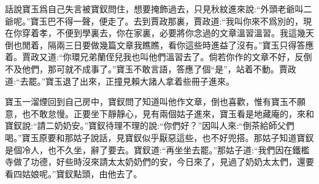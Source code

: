 


\begin{parag}
    話說寶玉爲自己失言被寶釵問住，想要掩飾過去，只見秋紋進來說:“外頭老爺叫二爺呢。”寶玉巴不得一聲，便走了。去到賈政那裏，賈政道:“我叫你來不爲別的，現在你穿着孝，不便到學裏去，你在家裏，必要將你念過的文章溫習溫習。我這幾天倒也閒着，隔兩三日要做幾篇文章我瞧瞧，看你這些時進益了沒有。”寶玉只得答應着。賈政又道:“你環兄弟蘭侄兒我也叫他們溫習去了。倘若你作的文章不好，反倒不及他們，那可就不成事了。”寶玉不敢言語，答應了個“是”，站着不動。賈政道:“去罷。”寶玉退了出來，正撞見賴大諸人拿着些冊子進來。
\end{parag}


\begin{parag}
    寶玉一溜煙回到自己房中，寶釵問了知道叫他作文章，倒也喜歡，惟有寶玉不願意，也不敢怠慢。正要坐下靜靜心，見有兩個姑子進來，寶玉看是地藏庵的，來和寶釵說:“請二奶奶安。”寶釵待理不理的說:“你們好？”因叫人來:“倒茶給師父們喝。”寶玉原要和那姑子說話，見寶釵似乎厭惡這些，也不好兜搭。那姑子知道寶釵是個冷人，也不久坐，辭了要去。寶釵道:“再坐坐去罷。”那姑子道:“我們因在鐵檻寺做了功德，好些時沒來請太太奶奶們的安，今日來了，見過了奶奶太太們，還要看四姑娘呢。”寶釵點頭，由他去了。
\end{parag}


